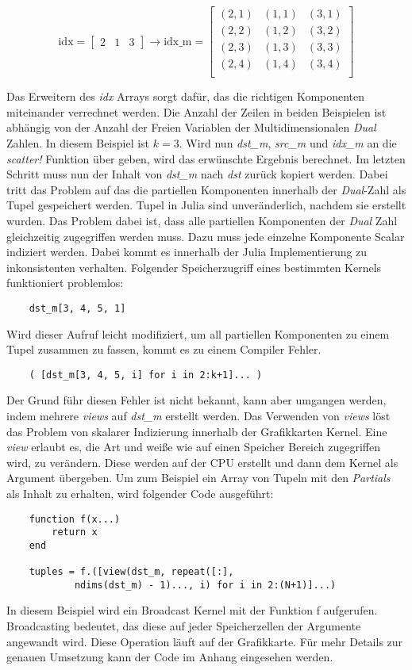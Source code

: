 \begin{equation}
\text{idx}= 
\begin{bmatrix}
 2 & 1 & 3
\end{bmatrix}
\rightarrow
\text{idx\_m} = 
\begin{bmatrix}
 (2, 1) & (1, 1) & (3, 1) \\ 
 (2, 2) & (1, 2) & (3, 2) \\
 (2, 3) & (1, 3) & (3, 3) \\
 (2, 4) & (1, 4) & (3, 4) \\
\end{bmatrix}
\end{equation}

Das Erweitern des \textit{idx} Arrays sorgt dafür, das die richtigen Komponenten miteinander verrechnet werden.
Die Anzahl der Zeilen in beiden Beispielen ist abhängig von der Anzahl der Freien Variablen  
der Multidimensionalen \textit{Dual} Zahlen. In diesem Beispiel ist $k = 3$.
Wird nun \textit{dst\_m}, \textit{src\_m} und \textit{idx\_m} an die \textit{scatter!} Funktion über
geben, wird das erwünschte Ergebnis berechnet. 
Im letzten Schritt muss nun der Inhalt von \textit{dst\_m} nach \textit{dst} zurück kopiert werden.
Dabei tritt das Problem auf das die partiellen Komponenten innerhalb der \textit{Dual}-Zahl
als Tupel gespeichert werden.
Tupel in Julia sind unveränderlich, nachdem sie erstellt wurden.
Das Problem dabei ist, dass alle partiellen Komponenten der \textit{Dual} Zahl gleichzeitig zugegriffen werden muss.
Dazu muss jede einzelne Komponente Scalar indiziert werden.
Dabei kommt es innerhalb der Julia Implementierung zu inkonsistenten verhalten.
Folgender Speicherzugriff eines bestimmten Kernels funktioniert problemlos:


\begin{verbatim}
    dst_m[3, 4, 5, 1]
\end{verbatim}
Wird dieser Aufruf leicht modifiziert, um all partiellen Komponenten zu einem Tupel zusammen zu fassen, 
kommt es zu einem Compiler Fehler.
\begin{verbatim}
    ( [dst_m[3, 4, 5, i] for i in 2:k+1]... )
\end{verbatim}
Der Grund führ diesen Fehler ist nicht bekannt, kann aber umgangen werden, indem mehrere \textit{views} auf
\textit{dst\_m} erstellt werden.
Das Verwenden von \textit{views} löst das Problem von skalarer Indizierung innerhalb der Grafikkarten Kernel. 
Eine \textit{view} erlaubt es, die Art und weiße wie auf einen Speicher Bereich zugegriffen wird, zu verändern.
Diese werden auf der CPU erstellt und dann dem Kernel als Argument übergeben.
Um zum Beispiel ein Array von Tupeln mit den \textit{Partials} als Inhalt zu erhalten, wird folgender Code ausgeführt:
\begin{verbatim}
	function f(x...)
		return x
	end
	
	tuples = f.([view(dst_m, repeat([:], 
	        ndims(dst_m) - 1)..., i) for i in 2:(N+1)]...)
\end{verbatim}
In diesem Beispiel wird ein Broadcast Kernel mit der Funktion f aufgerufen.
Broadcasting bedeutet, das diese auf jeder Speicherzellen der Argumente angewandt wird.
Diese Operation läuft auf der Grafikkarte.
Für mehr Details zur genauen Umsetzung kann der Code im Anhang eingesehen werden.